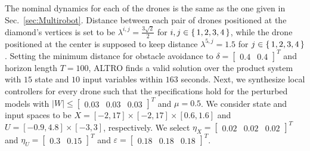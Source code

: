 The nominal dynamics for each of the drones is the same as the one  given in Sec.~\ref{sec:Multirobot}. Distance between each pair of drones positioned at the diamond's vertices is set to be $\lambda^{i,j}=\frac{3\sqrt{2}}{2}$ for $i,j\in\set{1,2,3,4}$, while the drone positioned at the center is supposed to keep distance $\lambda^{5,j}=1.5$ for $j\in\set{1,2,3,4}$. Setting the minimum distance for obstacle avoidance to $\delta=\begin{bmatrix}0.4&0.4\end{bmatrix}^T$ and horizon length $T=100$, ALTRO finds a valid solution over the product system with $15$ state and $10$ input variables within $163$ seconds.
Next, we synthesize local controllers for every drone such that the specifications hold for the perturbed models with $|W|\leq \begin{bmatrix}0.03&0.03&0.03\end{bmatrix}^T$ and $\mu=0.5$. %
We consider state and input spaces to be $X=[-2,17]\times[-2,17]\times[0.6,1.6]$ and
$U=[-0.9,4.8]\times[-3,3]$, respectively. We select $\eta_{X}=\begin{bmatrix}0.02&0.02&0.02\end{bmatrix}^T$ and
$\eta_{U}=\begin{bmatrix}0.3&0.15\end{bmatrix}^T$ and $\varepsilon=\begin{bmatrix}0.18&0.18&0.18\end{bmatrix}^T$.%
